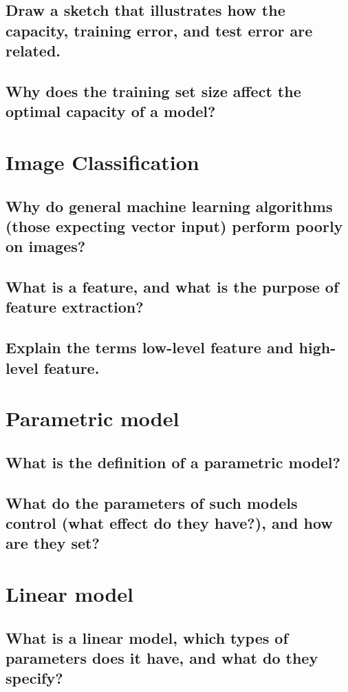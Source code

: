 \subsection{Draw a sketch that illustrates how the capacity, training error, and test error are related.}
\subsection{Why does the training set size affect the optimal capacity of a model?}

\section{Image Classification}
\subsection{Why do general machine learning algorithms (those expecting vector input) perform poorly on images?}
\subsection{What is a feature, and what is the purpose of feature extraction?}
\subsection{Explain the terms low-level feature and high-level feature.}

\section{Parametric model}
\subsection{What is the definition of a parametric model?}
\subsection{What do the parameters of such models control (what effect do they have?), and how are they set?}

\section{Linear model}
\subsection{What is a linear model, which types of parameters does it have, and what do they specify?}

